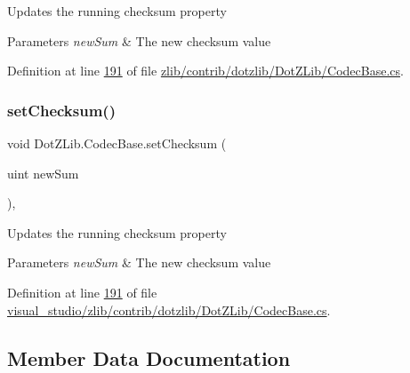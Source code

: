 Updates the running checksum property 


\begin{DoxyParams}{Parameters}
{\em new\+Sum} & The new checksum value\\
\hline
\end{DoxyParams}


Definition at line \hyperlink{zlib_2contrib_2dotzlib_2_dot_z_lib_2_codec_base_8cs_source_l00191}{191} of file \hyperlink{zlib_2contrib_2dotzlib_2_dot_z_lib_2_codec_base_8cs_source}{zlib/contrib/dotzlib/\+Dot\+Z\+Lib/\+Codec\+Base.\+cs}.

\mbox{\label{class_dot_z_lib_1_1_codec_base_a5dfa2dddf3ac857652af7fd8e3d2034d}} 
\subsubsection{\texorpdfstring{set\+Checksum()}{setChecksum()}\hspace{0.1cm}{\footnotesize\ttfamily [2/2]}}
{\footnotesize\ttfamily void Dot\+Z\+Lib.\+Codec\+Base.\+set\+Checksum (\begin{DoxyParamCaption}\item[{uint}]{new\+Sum }\end{DoxyParamCaption})\hspace{0.3cm}{\ttfamily [inline]}, {\ttfamily [protected]}}



Updates the running checksum property 


\begin{DoxyParams}{Parameters}
{\em new\+Sum} & The new checksum value\\
\hline
\end{DoxyParams}


Definition at line \hyperlink{visual__studio_2zlib_2contrib_2dotzlib_2_dot_z_lib_2_codec_base_8cs_source_l00191}{191} of file \hyperlink{visual__studio_2zlib_2contrib_2dotzlib_2_dot_z_lib_2_codec_base_8cs_source}{visual\+\_\+studio/zlib/contrib/dotzlib/\+Dot\+Z\+Lib/\+Codec\+Base.\+cs}.



\subsection{Member Data Documentation}
\mbox{\label{class_dot_z_lib_1_1_codec_base_a9dd3f18cc5e81e1a871279abeda2da84}} 
